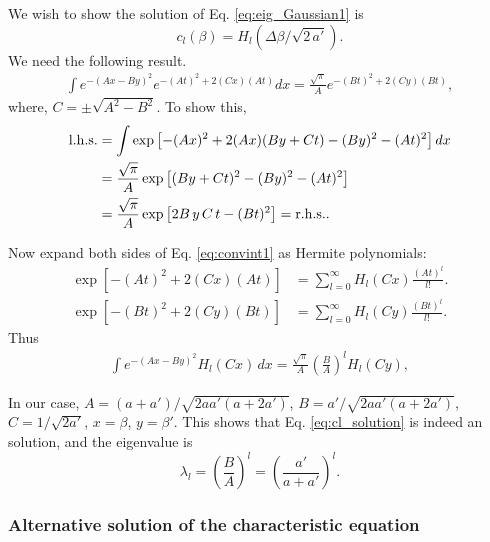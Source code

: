 \documentclass[aip,jcp,preprint,notitlepage, superscriptaddress]{revtex4-1}
\begin{document}
We wish to show the solution of
Eq. \eqref{eq:eig_Gaussian1}
is
\begin{equation}
c_l(\beta) = H_l(\Delta\beta/\sqrt{2\,a'}).
\label{eq:cl_solution}
\end{equation}
%
We need the following result.
%
\begin{align}
\int
e^{
  -(A x - B y)^2
}
e^{
  -(A t)^2 + 2 (C x) (A t)
}
d x
=
\frac{ \sqrt \pi } { A }
e^{
  -(B t)^2 + 2 (C y) (B t)
},
\label{eq:convint1}
\end{align}
where,
$C = \pm\sqrt{A^2 - B^2}$.
%
To show this,
%
\begin{align*}
\mathrm{l.h.s.}
&=
\int
\exp\left[
  -(A x)^2 + 2 (A x) (B y + C t)
  -(B y)^2 -(A t)^2
\right]
d x
\notag \\
&=
\frac{ \sqrt \pi } { A }
\exp\left[
  (B y + C t)^2 - (B y)^2 - (A t)^2
\right]
\notag \\
&=
\frac{ \sqrt \pi }{ A }
\exp\left[
  2 B \, y \, C \, t - (B t)^2
\right]
=
\mathrm{r.h.s.}
.
\end{align*}



Now expand both sides of Eq. \eqref{eq:convint1}
as Hermite polynomials:
%
\begin{align*}
\exp\left[
  -(A t)^2 + 2 (C x) (A t)
\right]
&=
\sum_{l = 0}^\infty
  H_l(C x) \frac{ (A t)^l }{ l! }.
\\
\exp\left[
  -(B t)^2 + 2 (C y) (B t)
\right]
&=
\sum_{l = 0}^\infty
  H_l(C y) \frac{ (B t)^l }{ l! }.
\end{align*}
%
Thus
%
\begin{align}
\int
e^{
  -(A x - B y)^2
}
H_l(C x) \, d x
=
\frac{ \sqrt \pi } { A }
\left(
  \frac B A
\right)^l
H_l(C y),
\label{eq:convint1_Hermite}
\end{align}



In our case,
$A = (a + a')/\sqrt{2 a a' (a + 2 a')}$,
$B = a'/\sqrt{2 a a' (a + 2 a')}$,
$C = 1/\sqrt{2 a'}$,
$x = \beta$,
$y = \beta'$.
%
This shows that
Eq. \eqref{eq:cl_solution}
is indeed an solution,
and the eigenvalue is
\begin{equation}
\lambda_l
=
\left( \frac{ B }{ A } \right)^l
=
\left( \frac{ a' }{ a + a' } \right)^l.
\end{equation}





\subsubsection{Alternative solution of the characteristic equation}
\end{document}
